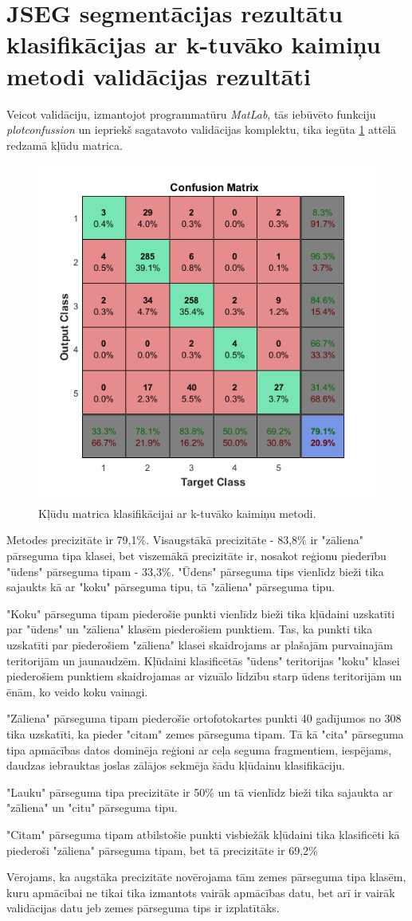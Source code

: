 \documentclass[12pt,paper=a4]{report}
\begin{document}
\section{JSEG segmentācijas rezultātu klasifikācijas ar k-tuvāko kaimiņu metodi validācijas rezultāti}Veicot validāciju, izmantojot programmatūru \textit{MatLab}, tās iebūvēto funkciju \textit{plotconfussion} un iepriekš sagatavoto validācijas komplektu, tika iegūta \ref{fig:confMatrix} attēlā redzamā kļūdu matrica. 
\begin{figure}[h!]
\centering
\includegraphics[width=.7\linewidth]{confMatrix}
\caption{Kļūdu matrica klasifikācijai ar k-tuvāko kaimiņu metodi.}
\label{fig:confMatrix}
\end{figure}\par
Metodes precizitāte ir 79,1\%. Visaugstākā precizitāte - 83,8\% ir "zāliena" pārseguma tipa klasei, bet viszemākā precizitāte ir, nosakot reģionu piederību "ūdens" pārseguma tipam - 33,3\%. "Ūdens" pārseguma tips vienlīdz bieži tika sajaukts kā ar "koku" pārseguma tipu, tā "zāliena" pārseguma tipu.\par
"Koku" pārseguma tipam piederošie punkti vienlīdz bieži tika kļūdaini uzskatīti par "ūdens" un "zāliena" klasēm piederošiem punktiem. Tas, ka punkti tika uzskatīti par piederošiem "zāliena" klasei skaidrojams ar plašajām purvainajām teritorijām un jaunaudzēm. Kļūdaini klasificētās "ūdens" teritorijas "koku" klasei piederošiem punktiem skaidrojamas ar vizuālo līdzību starp ūdens teritorijām un ēnām, ko veido koku vainagi.\par
"Zāliena" pārseguma tipam piederošie ortofotokartes punkti 40 gadījumos no 308 tika uzskatīti, ka pieder "citam" zemes pārseguma tipam. Tā kā "cita" pārseguma tipa apmācības datos dominēja reģioni ar ceļa seguma fragmentiem, iespējams, daudzas iebrauktas joslas zālājos sekmēja šādu kļūdainu klasifikāciju.\par 
"Lauku" pārseguma tipa precizitāte ir 50\% un tā vienlīdz bieži tika sajaukta ar "zāliena" un "citu" pārseguma tipu. \par
"Citam" pārseguma tipam atbilstošie punkti visbiežāk kļūdaini tika klasificēti kā piederoši "zāliena" pārseguma tipam, bet tā precizitāte ir 69,2\%\par
Vērojams, ka augstāka precizitāte novērojama tām zemes pārseguma tipa klasēm, kuru apmācībai ne tikai tika izmantots vairāk apmācības datu, bet arī ir vairāk validācijas datu jeb zemes pārseguma tips ir izplatītāks.
\end{document}

